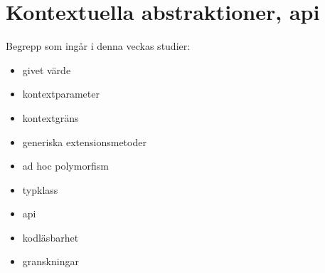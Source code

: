 \chapter{Kontextuella abstraktioner, api}\label{chapter:W11}
Begrepp som ingår i denna veckas studier:
\begin{itemize}[noitemsep,label={$\square$},leftmargin=*]
\item givet värde
\item kontextparameter
\item kontextgräns
\item generiska extensionsmetoder
\item ad hoc polymorfism
\item typklass
\item api
\item kodläsbarhet
\item granskningar\end{itemize}
